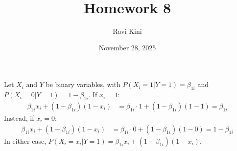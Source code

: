\documentclass{article}
\title{Homework 8}
\author{Ravi Kini}
\date{November 28, 2025}
\begin{document}
\maketitle

\problem{}
Let $X_i$ and $Y$ be binary variables, with $P(X_i = 1 | Y = 1) = \beta_{1i}$ and $P(X_i = 0 | Y = 1) = 1 - \beta_{1i}$. If $x_i = 1$:
\begin{align*}
    \beta_{1i}x_i + (1 - \beta_{1i})(1 - x_i) & = \beta_{1i} \cdot 1 + (1 - \beta_{1i})(1 - 1) = \beta_{1i}
\end{align*}
Instead, if $x_i = 0$:
\begin{align*}
    \beta_{1i}x_i + (1 - \beta_{1i})(1 - x_i) & = \beta_{1i} \cdot 0 + (1 - \beta_{1i})(1 - 0) = 1 - \beta_{1i}
\end{align*}
In either case, $P(X_i = x_i | Y = 1) = \beta_{1i}x_i + (1 - \beta_{1i})(1 - x_i)$.
\end{document}
